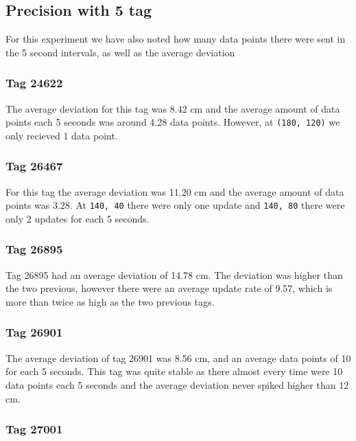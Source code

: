 \subsection{Precision with 5 tag}
For this experiment we have also noted how many data points there were sent in the 5 second intervals, as well as the average deviation

\subsubsection{Tag 24622}
The average deviation for this tag was 8.42 cm and the average amount of data points each 5 seconds was around 4.28 data points.
However, at \texttt{(180, 120)} we only recieved 1 data point.

\subsubsection{Tag 26467}
For this tag the average deviation was 11.20 cm and the average amount of data points was 3.28.
At \texttt{140, 40} there were only one update and \texttt{140, 80} there were only 2 updates for each 5 seconds.

\subsubsection{Tag 26895}
Tag 26895 had an average deviation of 14.78 cm. 
The deviation was higher than the two previous, however there were an average update rate of 9.57, which is more than twice as high as the two previous tags.

\subsubsection{Tag 26901}
The average deviation of tag 26901 was 8.56 cm, and an average data points of 10 for each 5 seconds.
This tag was quite stable as there almost every time were 10 data points each 5 seconds and the average deviation never spiked higher than 12 cm.

\subsubsection{Tag 27001}

